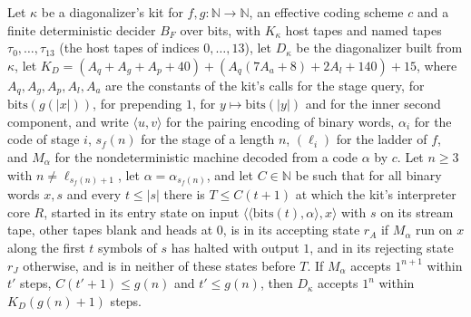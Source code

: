\begin{theorem}
\label{Turing.NTimeDiag.dz_mid_complete}
\leanok
{}
Let $\kappa$ be a diagonalizer's kit for $f, g : \mathbb{N} \to \mathbb{N}$, an effective coding scheme $c$ and a finite deterministic decider $B_F$ over bits, with $K_\kappa$ host tapes and named tapes $\tau_0, \dots, \tau_{13}$ (the host tapes of indices $0, \dots, 13$), let $D_\kappa$ be the diagonalizer built from $\kappa$, let $K_D = (A_q + A_g + A_p + 40) + (A_q(7A_a + 8) + 2A_l + 140) + 15$, where $A_q, A_g, A_p, A_l, A_a$ are the constants of the kit's calls for the stage query, for $\mathrm{bits}(g(|x|))$, for prepending $1$, for $y \mapsto \mathrm{bits}(|y|)$ and for the inner second component, and write $\langle u, v\rangle$ for the pairing encoding of binary words, $\alpha_i$ for the code of stage $i$, $s_f(n)$ for the stage of a length $n$, $(\ell_i)$ for the ladder of $f$, and $M_\alpha$ for the nondeterministic machine decoded from a code $\alpha$ by $c$. Let $n \ge 3$ with $n \ne \ell_{s_f(n) + 1}$, let $\alpha = \alpha_{s_f(n)}$, and let $C \in \mathbb{N}$ be such that for all binary words $x, s$ and every $t \le |s|$ there is $T \le C(t + 1)$ at which the kit's interpreter core $R$, started in its entry state on input $\langle\langle \mathrm{bits}(t), \alpha\rangle, x\rangle$ with $s$ on its stream tape, other tapes blank and heads at $0$, is in its accepting state $r_A$ if $M_\alpha$ run on $x$ along the first $t$ symbols of $s$ has halted with output $1$, and in its rejecting state $r_J$ otherwise, and is in neither of these states before $T$. If $M_\alpha$ accepts $1^{n+1}$ within $t'$ steps, $C(t' + 1) \le g(n)$ and $t' \le g(n)$, then $D_\kappa$ accepts $1^n$ within $K_D(g(n) + 1)$ steps.
\end{theorem}

